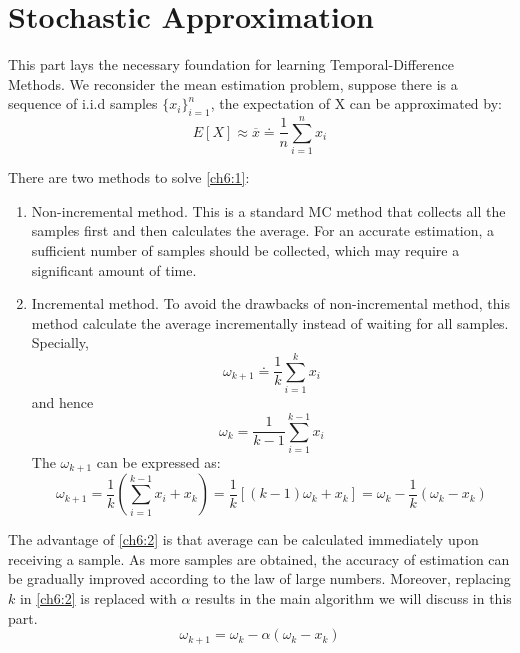 \part{Stochastic Approximation}
This part lays the necessary foundation for learning Temporal-Difference Methods. We reconsider the mean estimation problem, suppose there is a
sequence of i.i.d samples $\{x_{i}\}_{i=1}^{n}$, the expectation of X can be approximated by:
\begin{equation}\label{ch6:1}
	E[X] \approx \overline{x} \doteq \frac{1}{n}\sum_{i=1}^{n}x_{i}
\end{equation}

There are two methods to solve \ref{ch6:1}:
\begin{enumerate}

	\item Non-incremental method. This is a standard MC method that collects all the samples first and then calculates the average. For an accurate
	      estimation, a sufficient number of samples should be collected, which may require a significant amount of time.
	\item Incremental method. To avoid the drawbacks of non-incremental method, this method calculate the average incrementally instead of waiting for
	      all samples. Specially,
	      \begin{equation*}
		      \omega_{k+1} \doteq \frac{1}{k}\sum_{i=1}^{k}x_{i}
	      \end{equation*}
	      and hence
	      \begin{equation*}
		      \omega_{k} = \frac{1}{k-1}\sum_{i=1}^{k-1}x_{i}
	      \end{equation*}
	      The $\omega_{k+1}$ can be expressed as:
	      \begin{equation}\label{ch6:2}
		      \omega_{k+1}=\frac{1}{k}(\sum_{i=1}^{k-1}x_{i}+x_{k}) = \frac{1}{k}\left[(k-1) \omega_{k}+x_{k}\right]= \omega_{k}-\frac{1}{k}(\omega_{k}-x_{k})
	      \end{equation}

\end{enumerate}
The advantage of \ref{ch6:2} is that average can be calculated immediately upon receiving a sample. As more samples are obtained, the accuracy of estimation can be gradually improved according to the law of large numbers. Moreover, replacing $k$ in \ref{ch6:2} is replaced with $\alpha$ results in the main algorithm we will discuss in this part.
\begin{equation}\label{ch6:3}
	\omega_{k+1}=\omega_{k}-\alpha(\omega_{k}-x_{k})
\end{equation}

